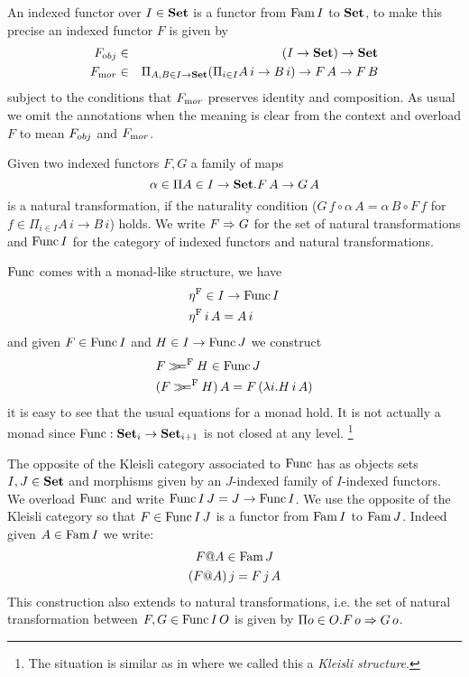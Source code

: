 \documentclass[10pt, conference, compsocconf]{IEEEtran}
\begin{document}
An indexed functor over $I\in\mathbf{Set}$ is a functor from $\mathrm{Fam}\,I$ to
$\mathbf{Set}$, to make this precise an indexed functor $F$ is given by
\begin{eqnarray*}
  {F}_{\mathrm obj} & \in & (I \to \mathbf{Set}) \to \mathbf{Set}\\
  {F}_{\mathrm mor} & \in & \Pi_{A,B\in I\to\mathbf{Set}}(\Pi_{i\in I} A\,i \to B\,i)
  \to F\,A \to F\,B
\end{eqnarray*}
subject to the conditions that ${F}_{\mathrm mor}$ preserves identity and
composition. As usual we omit the annotations when the meaning is
clear from the context and overload $F$ to mean ${F}_{\mathrm obj}$ and
${F}_{\mathrm mor}$. 

Given two indexed functors $F,G$ a family of maps 
\[ \alpha \in \Pi A\in I\to\mathbf{Set}.F\,A \to G\,A\] is a natural
transformation, if the naturality condition 
($G\, f \circ \alpha\, A = \alpha\,B\circ F\,f$ for $f\in \Pi_{i\in I} A\,i \to B\,i$)
holds. 
We write $F \Rightarrow G$ for the set of
natural transformations and $\mathrm{Func}\,I$ for the category of
indexed functors and natural transformations.

$\mathrm{Func}$ comes with a monad-like structure, we have
\begin{align*}
& {\eta}^{\mathrm F} \in I \to \mathrm{Func}\,I\\  
& {\eta}^{\mathrm F}\,i\,A = A\,i
\end{align*}
and given $F\in \mathrm{Func}\,I$ and $H\in I\to\mathrm{Func}\,J$ we construct
\begin{align*}
& F \bindF H \in \Func\,J \\
& (F \bindF H)\,A = F\,(\lambda i.H\,i\,A)
\end{align*}
it is easy to see that the usual equations for a monad hold. It is not
actually a monad since $\mathrm{Func} : \mathbf{Set}_i \to \mathbf{Set}_{i+1}$ is not closed
at any level.
\footnote{The situation is similar as in \cite{alti:csl99} where we called this a \emph{Kleisli structure}.}

The opposite of the Kleisli category associated to $\mathrm{Func}$ has as
objects sets $I,J\in \mathbf{Set}$ and morphisms given by an $J$-indexed
family of $I$-indexed functors.  We overload $\mathrm{Func}$ and write
$\mathrm{Func}\,I\,J = J \to \mathrm{Func}\,I$. We use the opposite of the Kleisli
category so that $F\in \mathrm{Func}\,I\,J$ is a functor from $\mathrm{Fam}\,I$ to
$\mathrm{Fam}\,J$. Indeed given $A\in \mathrm{Fam}\,I$ we write:
\begin{gather*}
  F @ A \in \mathrm{Fam}\,J\\
  (F @ A)\,j = F\,j\,A
\end{gather*}
This construction also extends to natural transformations,
i.e. the set of natural transformation between $F,G \in \mathrm{Func}\,I\,O$
is given by $\Pi o\in O.F\,o \Rightarrow G\,o$.
\end{document}
